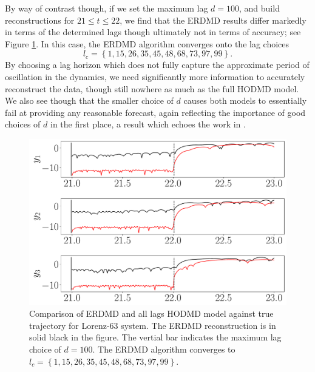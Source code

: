 \documentclass[a4paper,11pt]{article}
\begin{document}
By way of contrast though, if we set the maximum lag $d=100$, and build reconstructions for $21\leq t \leq 22$, we find that the ERDMD results differ  markedly in terms of the determined lags though ultimately not in terms of accuracy; see Figure \ref{fig:lorenz_compare_d_100}.  In this case, the ERDMD algorithm converges onto the lag choices 
$$
l_{c}=\left\{1,15, 26, 35, 45, 48, 68, 73, 97,99\right\}.
$$  
By choosing a lag horizon which does not fully capture the approximate period of oscillation in the dynamics, we need significantly more information to accurately reconstruct the data, though still nowhere as much as the full HODMD model.  We also see though that the smaller choice of $d$ causes both models to essentially fail at providing any reasonable forecast, again reflecting the importance of good choices of $d$ in the first place, a result which echoes the work in \cite{duraisamy}.
\begin{figure}[!h]
\centering
\includegraphics[width=.8\textwidth]{Lorenz_error_compare_w_mx_lag_100}
\caption{Comparison of ERDMD and all lags HODMD model against true trajectory for Lorenz-63 system.  The ERDMD reconstruction is in solid black in the figure.  The vertial bar indicates the maximum lag choice of $d=100$. The ERDMD algorithm converges to $l_{c}=\left\{1,15, 26, 35, 45, 48, 68, 73, 97,99\right\}$.}
\label{fig:lorenz_compare_d_100}
\end{figure}
 
\end{document}
